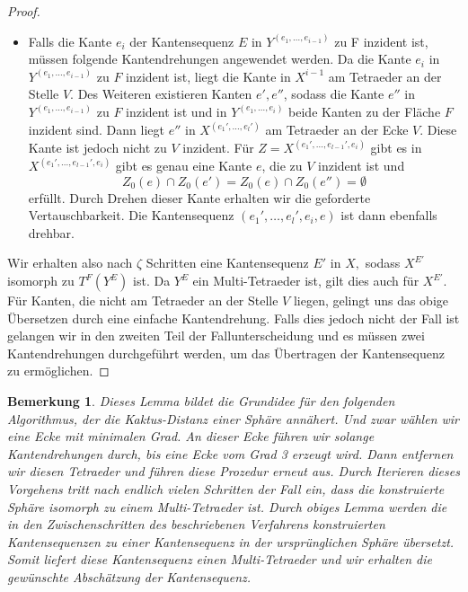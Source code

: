 \documentclass[12pt,titlepage,twoside,cleardoublepage]{article}
\theoremstyle{nummermitklammern}
\newtheorem{bemerkung}[temp]{Bemerkung}
\newtheorem{bemerkung}[zahl]{Bemerkung}
\numberwithin{equation}{section}
\begin{document}
\begin{proof}
\begin{itemize}
\item Falls die Kante $e_i$ der Kantensequenz $E$ in $Y^{(e_1,\ldots,e_{i-1})}$ zu F inzident ist, müssen folgende Kantendrehungen angewendet werden. Da die Kante $e_i$ in $Y^{(e_1,\ldots,e_{i-1})}$ zu $F$ inzident ist, liegt die Kante in $X^{i-1}$ am Tetraeder an der Stelle $V.$
Des Weiteren existieren Kanten $e',e''$, sodass die Kante $e''$ in $Y^{(e_1,\ldots,e_{i-1})}$ zu $F$ inzident ist und in $Y^{(e_1,\ldots,e_{i})}$ beide Kanten zu der Fläche $F$ inzident sind.
Dann liegt $e''$ in $X^{(e_1',\ldots,e_l')}$ am Tetraeder an der Ecke $V.$ Diese Kante ist jedoch nicht zu $V$ inzident.  
Für $Z=X^{(e_1',\ldots,e_{l-1}',e_i)}$ gibt es in $X^{(e_1',\ldots,e_{l-1}',e_i)}$ gibt es genau eine Kante $e$, die zu $V$ inzident ist und 
 \[
Z_0(e)\cap Z_0(e')=Z_0(e)\cap Z_0(e'')=\emptyset
\]
erfüllt. Durch Drehen dieser Kante erhalten wir die geforderte Vertauschbarkeit. Die Kantensequenz $(e_1',\ldots,e_l',e_i,e)$ ist dann ebenfalls drehbar.
\end{itemize}
Wir erhalten also nach $\zeta$ Schritten eine Kantensequenz $E'$ in $X,$ sodass $X^{E'}$ isomorph zu $T^F(Y^{E})$ ist. Da $Y^{E}$ ein Multi-Tetraeder ist, gilt dies auch für $X^{E'}.$ Für Kanten, die nicht am Tetraeder an der Stelle $V$ liegen, gelingt uns das obige Übersetzen durch eine einfache Kantendrehung. Falls dies jedoch nicht der Fall ist gelangen wir in den zweiten Teil der Fallunterscheidung und es müssen zwei Kantendrehungen durchgeführt werden, um das Übertragen der Kantensequenz zu ermöglichen.
\end{proof}
\begin{bemerkung}
Dieses Lemma bildet die Grundidee für den folgenden Algorithmus, der die Kaktus-Distanz einer Sphäre annähert. Und zwar wählen wir eine Ecke mit minimalen Grad. An dieser Ecke führen wir solange Kantendrehungen durch, bis eine Ecke vom Grad 3 erzeugt wird. Dann entfernen wir diesen Tetraeder und führen diese Prozedur erneut aus. Durch Iterieren dieses Vorgehens tritt nach endlich vielen Schritten der Fall ein, dass die konstruierte Sphäre isomorph zu einem Multi-Tetraeder ist. Durch obiges Lemma werden die in den Zwischenschritten des beschriebenen Verfahrens konstruierten Kantensequenzen zu einer Kantensequenz in der ursprünglichen Sphäre übersetzt. Somit liefert diese Kantensequenz einen Multi-Tetraeder und wir erhalten die gewünschte Abschätzung der Kantensequenz.
\end{bemerkung}
\end{document}
